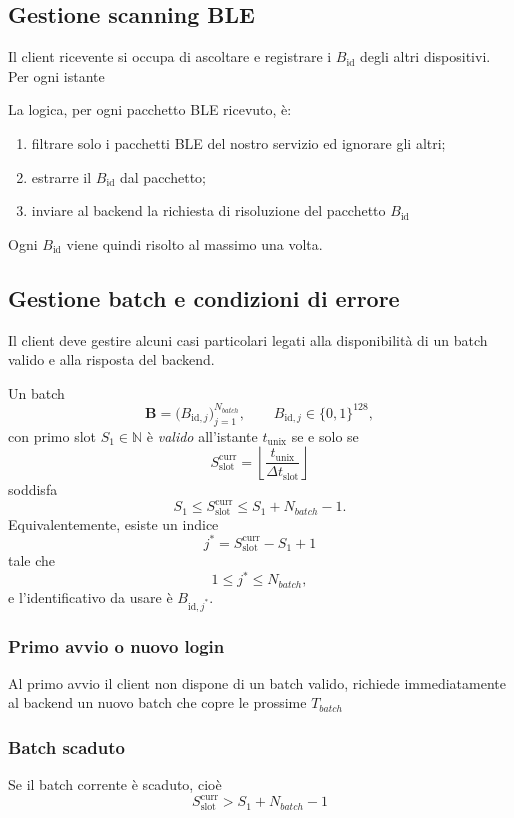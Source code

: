 \documentclass[a4paper,11pt]{article}
\begin{document}
\subsection{Gestione scanning BLE}
Il client ricevente si occupa di ascoltare e registrare i $B_{\text{id}}$ degli altri dispositivi. Per ogni istante

La logica, per ogni pacchetto BLE ricevuto, è:
\begin{enumerate}
  \item filtrare solo i pacchetti BLE del nostro servizio ed ignorare gli altri;
  \item estrarre il $B_{\text{id}}$ dal pacchetto;
  \item inviare al backend la richiesta di risoluzione del pacchetto $B_{\text{id}}$
\end{enumerate}
Ogni $B_{\text{id}}$ viene quindi risolto al massimo una volta.

\subsection{Gestione batch e condizioni di errore}
Il client deve gestire alcuni casi particolari legati alla disponibilità di un batch valido e alla risposta del backend.

Un batch
\[
  \mathbf{B}
  = \bigl(B_{\text{id},j}\bigr)_{j=1}^{N_{batch}},
  \qquad B_{\text{id},j} \in \{0,1\}^{128},
\]
con primo slot \(S_1 \in \mathbb{N}\) è \emph{valido} all'istante \(t_{\text{unix}}\) se e solo se
\[
  S_{\text{slot}}^{\text{curr}}
  = \left\lfloor \frac{t_{\text{unix}}}{\Delta t_{\text{slot}}} \right\rfloor
\]
soddisfa
\[
  S_1 \le S_{\text{slot}}^{\text{curr}} \le S_1 + N_{batch} - 1.
\]
Equivalentemente, esiste un indice
\[
  j^\ast = S_{\text{slot}}^{\text{curr}} - S_1 + 1
\]
tale che
\[
  1 \le j^\ast \le N_{batch},
\]
e l'identificativo da usare è \(B_{\text{id},j^\ast}\).

\subsubsection{Primo avvio o nuovo login}
Al primo avvio il client non dispone di un batch valido, richiede immediatamente al backend un nuovo batch che copre le prossime $T_{batch}$

\subsubsection{Batch scaduto}
Se il batch corrente è scaduto, cioè
\[
  S_{\text{slot}}^{\text{curr}} > S_1 + N_{batch} - 1
\]
\end{document}
